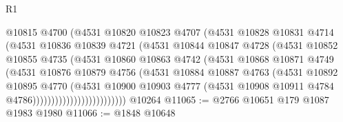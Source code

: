 \begin{lexlean}{R1}
\begin{coremodule}
                              @10815
                              @4700
                              (@4531
                                @10820
                                @10823
                                @4707
                                (@4531
                                  @10828
                                  @10831
                                  @4714
                                  (@4531
                                    @10836
                                    @10839
                                    @4721
                                    (@4531
                                      @10844
                                      @10847
                                      @4728
                                      (@4531
                                        @10852
                                        @10855
                                        @4735
                                        (@4531
                                          @10860
                                          @10863
                                          @4742
                                          (@4531
                                            @10868
                                            @10871
                                            @4749
                                            (@4531
                                              @10876
                                              @10879
                                              @4756
                                              (@4531
                                                @10884
                                                @10887
                                                @4763
                                                (@4531
                                                  @10892
                                                  @10895
                                                  @4770
                                                  (@4531
                                                    @10900
                                                    @10903
                                                    @4777
                                                    (@4531
                                                      @10908
                                                      @10911
                                                      @4784
                                                      @4786)))))))))))))))))))))))))
    @10264
@11065 := @2766 @10651 @179 @1087 @1983 @1980
@11066 := @1848 @10648

\end{coremodule}
\end{lexlean}
